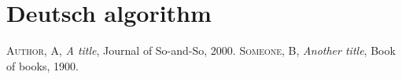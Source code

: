 \documentclass{article}
\begin{document}
\section{Deutsch algorithm}
\newpage
\begin{thebibliography}{x}
    {\scshape Author, A}, {\itshape A title}, Journal of So-and-So, 2000.
    {\scshape Someone, B}, {\itshape Another title}, Book of books, 1900.
\end{thebibliography}
\end{document}
